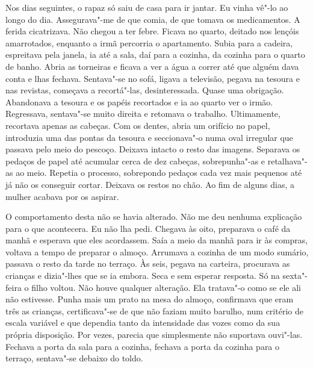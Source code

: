 Nos dias seguintes, o rapaz só saiu de casa para ir jantar. Eu vinha
vê"-lo ao longo do dia. Assegurava"-me de que comia, de que tomava os
medicamentos. A ferida cicatrizava. Não chegou a ter febre. Ficava no
quarto, deitado nos lençóis amarrotados, enquanto a irmã percorria o
apartamento. Subia para a cadeira, espreitava pela janela, ia até a
sala, daí para a cozinha, da cozinha para o quarto de banho. Abria as
torneiras e ficava a ver a água a correr até que alguém dava conta e
lhas fechava. Sentava"-se no sofá, ligava a televisão, pegava na tesoura
e nas revistas, começava a recortá"-las, desinteressada. Quase uma
obrigação. Abandonava a tesoura e os papéis recortados e ia ao quarto
ver o irmão. Regressava, sentava"-se muito direita e retomava o
trabalho. Ultimamente, recortava apenas as cabeças. Com os dentes, abria
um orifício no papel, introduzia uma das pontas da tesoura e
seccionava"-o numa oval irregular que passava pelo meio do pescoço.
Deixava intacto o resto das imagens. Separava os pedaços de papel até
acumular cerca de dez cabeças, sobrepunha"-as e retalhava"-as ao meio.
Repetia o processo, sobrepondo pedaços cada vez mais pequenos até já não
os conseguir cortar. Deixava os restos no chão. Ao fim de alguns dias, a
mulher acabava por os aspirar.

O comportamento desta não se havia alterado. Não me deu nenhuma
explicação para o que acontecera. Eu não lha pedi. Chegava às oito,
preparava o café da manhã e esperava que eles acordassem. Saía a meio
da manhã para ir às compras, voltava a tempo de preparar o almoço.
Arrumava a cozinha de um modo sumário, passava o resto da tarde no
terraço. Às seis, pegava na carteira, procurava as crianças e
dizia"-lhes que se ia embora. Seca e sem esperar resposta. Só na
sexta"-feira o filho voltou. Não houve qualquer alteração. Ela
tratava"-o como se ele ali não estivesse. Punha mais um prato na mesa do
almoço, confirmava que eram três as crianças, certificava"-se de que não
faziam muito barulho, num critério de escala variável e que dependia
tanto da intensidade das vozes como da sua própria disposição. Por
vezes, parecia que simplesmente não suportava ouvi"-las. Fechava a porta
da sala para a cozinha, fechava a porta da cozinha para o terraço,
sentava"-se debaixo do toldo.


